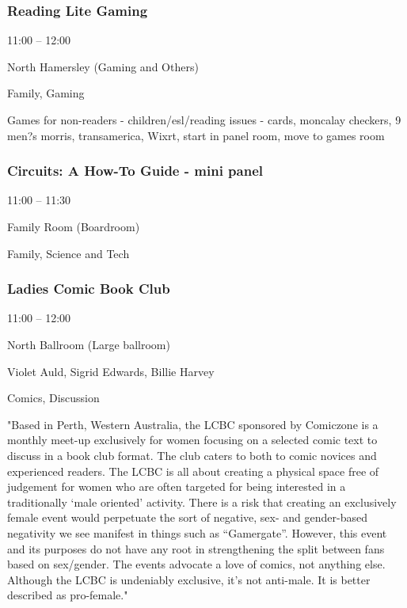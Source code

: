 \documentclass{scrreprt}
\begin{document}
\begin{multicols}{2}
\subsubsection*{Reading Lite Gaming}\begin{description}
\setlength{\itemsep}{0pt}
\setlength{\parsep}{0pt}
\setlength{\parskip}{0pt}
\item[Time:]{11:00 -- 12:00}
\item[Venue:]{North Hamersley (Gaming and Others)}
\item[Tags:]{Family, Gaming}\end{description}
Games for non-readers - children/esl/reading issues - cards, moncalay checkers, 9 men?s morris, transamerica, Wixrt, start in panel room, move to games room
\subsubsection*{Circuits: A How-To Guide - mini panel}\begin{description}
\setlength{\itemsep}{0pt}
\setlength{\parsep}{0pt}
\setlength{\parskip}{0pt}
\item[Time:]{11:00 -- 11:30}
\item[Venue:]{Family Room (Boardroom)}
\item[Tags:]{Family, Science and Tech}\end{description}

\subsubsection*{Ladies Comic Book Club}\begin{description}
\setlength{\itemsep}{0pt}
\setlength{\parsep}{0pt}
\setlength{\parskip}{0pt}
\item[Time:]{11:00 -- 12:00}
\item[Venue:]{North Ballroom (Large ballroom)}
\item[People:]{Violet Auld, Sigrid Edwards, Billie Harvey}
\item[Tags:]{Comics, Discussion}\end{description}
"Based in Perth, Western Australia, the LCBC sponsored by Comiczone is a monthly meet-up exclusively for women focusing on a selected comic text to discuss in a book club format. The club caters to both to comic novices and experienced readers. The LCBC is all about creating a physical space free of judgement for women who are often targeted for being interested in a traditionally ‘male oriented’ activity. There is a risk that creating an exclusively female event would perpetuate the sort of negative, sex- and gender-based negativity we see manifest in things such as “Gamergate”. However, this event and its purposes do not have any root in strengthening the split between fans based on sex/gender. The events advocate a love of comics, not anything else. Although the LCBC is undeniably exclusive, it’s not anti-male. It is better described as pro-female."

\end{multicols}
\end{document}
